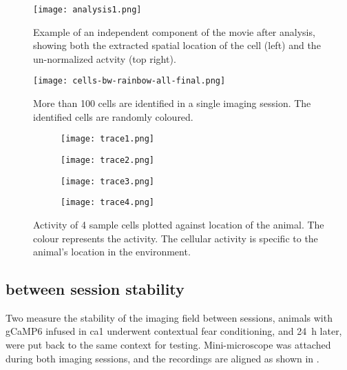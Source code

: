 \begin{figure}[h]
    \texttt{[image: analysis1.png]}
    \caption{Example of an independent component of the movie after analysis, showing both the extracted spatial location of the cell (left) and the un-normalized actvity (top right). \label{f.analysis}}
\end{figure}


\begin{figure}[h]
    \texttt{[image: cells-bw-rainbow-all-final.png]}
    \caption{More than 100 cells are identified in a single imaging session. The identified cells are randomly coloured. \label{f.ca1rainbow}}
\end{figure}


\begin{figure}[h]
    \begin{subfigure}[t]{.5\linewidth}
        \texttt{[image: trace1.png]}
    \end{subfigure}
    \begin{subfigure}[t]{.5\linewidth}
        \texttt{[image: trace2.png]}
    \end{subfigure}
    \begin{subfigure}[t]{.5\linewidth}
        \texttt{[image: trace3.png]}
    \end{subfigure}
    \begin{subfigure}[t]{.5\linewidth}
        \texttt{[image: trace4.png]}
    \end{subfigure}
    \caption{Activity of 4 sample cells plotted against location of the animal. The colour represents the  activity. The cellular activity is specific to the animal's location in the environment. \label{f.traceplot}}
\end{figure}

\subsection{between session stability}
Two measure the stability of the imaging field between sessions, animals with gCaMP6 infused in \gls{ca1} underwent contextual fear conditioning, and \SI{24}{\hour} later, were put back to the same context for testing. Mini-microscope was attached during both imaging sessions, and the recordings are aligned as shown in . 

